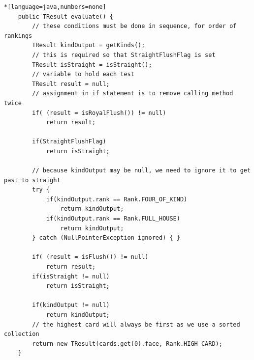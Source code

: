 \documentclass[11pt]{article}
\begin{document}
\begin{lstlisting}*[language=java,numbers=none]
    public TResult evaluate() {
        // these conditions must be done in sequence, for order of rankings
        TResult kindOutput = getKinds();
        // this is required so that StraightFlushFlag is set
        TResult isStraight = isStraight();
        // variable to hold each test
        TResult result = null;
        // assignment in if statement is to remove calling method twice
        if( (result = isRoyalFlush()) != null)
            return result;

        if(StraightFlushFlag)
            return isStraight;

        // because kindOutput may be null, we need to ignore it to get past to straight
        try {
            if(kindOutput.rank == Rank.FOUR_OF_KIND)
                return kindOutput;
            if(kindOutput.rank == Rank.FULL_HOUSE)
                return kindOutput;
        } catch (NullPointerException ignored) { }

        if( (result = isFlush()) != null)
            return result;
        if(isStraight != null)
            return isStraight;
       
        if(kindOutput != null)
            return kindOutput;
        // the highest card will always be first as we use a sorted collection
        return new TResult(cards.get(0).face, Rank.HIGH_CARD);
    }
\end{lstlisting}





\newpage
\end{document}
